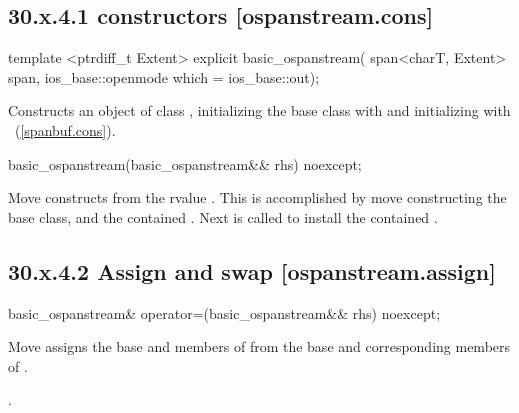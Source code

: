 \documentclass[ebook,11pt,article]{memoir}
\begin{document}
\subsection{30.x.4.1  constructors [ospanstream.cons]}
\label{ospanstream.cons}

\begin{itemdecl}
template <ptrdiff_t Extent>
explicit basic_ospanstream(
  span<charT, Extent> span,
  ios_base::openmode which = ios_base::out);
\end{itemdecl}

\begin{itemdescr}
\pnum
\effects
Constructs an object of class
,
initializing the base class with
and initializing  with
~(\ref{spanbuf.cons}).
\end{itemdescr}

\begin{itemdecl}
basic_ospanstream(basic_ospanstream&& rhs) noexcept;
\end{itemdecl}

\begin{itemdescr}
\pnum
\effects Move constructs from the rvalue . This
is accomplished by move constructing the base class, and the contained
.
Next  is called to
install the contained .
\end{itemdescr}

\subsection{30.x.4.2 Assign and swap [ospanstream.assign]}
\label{ospanstream.assign}

\begin{itemdecl}
basic_ospanstream& operator=(basic_ospanstream&& rhs) noexcept;
\end{itemdecl}

\begin{itemdescr}
\pnum
\effects Move assigns the base and members of  from the base and corresponding
members of .

\pnum
\returns {}.
\end{itemdescr}
\end{document}
